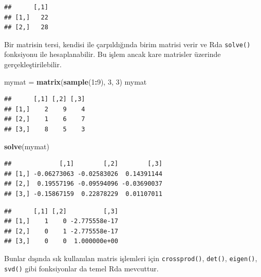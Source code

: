 \documentclass[]{book}
\newenvironment{Shaded}{\begin{snugshade}}{\end{snugshade}}
\newcommand{\DecValTok}[1]{\textcolor[rgb]{0.00,0.00,0.81}{#1}}
\newcommand{\KeywordTok}[1]{\textcolor[rgb]{0.13,0.29,0.53}{\textbf{#1}}}
\newcommand{\NormalTok}[1]{#1}
\newcommand{\OperatorTok}[1]{\textcolor[rgb]{0.81,0.36,0.00}{\textbf{#1}}}
\newcommand{\StringTok}[1]{\textcolor[rgb]{0.31,0.60,0.02}{#1}}
\begin{document}
\begin{verbatim}
##      [,1]
## [1,]   22
## [2,]   28
\end{verbatim}

Bir matrisin tersi, kendisi ile çarpıldığında birim matrisi verir ve Rda
\texttt{solve()} fonksiyonu ile hesaplanabilir. Bu işlem ancak kare
matrisler üzerinde gerçekleştirilebilir.

\begin{Shaded}
\begin{Highlighting}[]
\NormalTok{mymat =}\StringTok{ }\KeywordTok{matrix}\NormalTok{(}\KeywordTok{sample}\NormalTok{(}\DecValTok{1}\OperatorTok{:}\DecValTok{9}\NormalTok{), }\DecValTok{3}\NormalTok{, }\DecValTok{3}\NormalTok{)}
\NormalTok{mymat}
\end{Highlighting}
\end{Shaded}

\begin{verbatim}
##      [,1] [,2] [,3]
## [1,]    2    9    4
## [2,]    1    6    7
## [3,]    8    5    3
\end{verbatim}

\begin{Shaded}
\begin{Highlighting}[]
\KeywordTok{solve}\NormalTok{(mymat)}
\end{Highlighting}
\end{Shaded}

\begin{verbatim}
##             [,1]        [,2]        [,3]
## [1,] -0.06273063 -0.02583026  0.14391144
## [2,]  0.19557196 -0.09594096 -0.03690037
## [3,] -0.15867159  0.22878229  0.01107011
\end{verbatim}

\begin{Shaded}
\end{Shaded}

\begin{verbatim}
##      [,1] [,2]          [,3]
## [1,]    1    0 -2.775558e-17
## [2,]    0    1 -2.775558e-17
## [3,]    0    0  1.000000e+00
\end{verbatim}

Bunlar dışında sık kullanılan matris işlemleri için
\texttt{crossprod()}, \texttt{det()}, \texttt{eigen()}, \texttt{svd()}
gibi fonksiyonlar da temel Rda mevcuttur.
\end{document}
